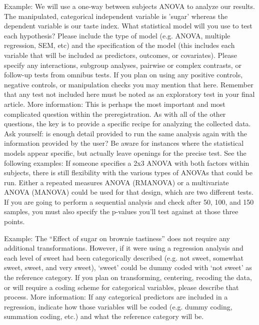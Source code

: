 \documentclass[highlight, explanations]{prereg}
\begin{document}
{Example:  We will use a one-way between subjects ANOVA to analyze our results. The manipulated, categorical independent variable is 'sugar' whereas the dependent variable is our taste index. 
}
{What statistical model will you use to test each hypothesis? Please include the type of model (e.g. ANOVA, multiple regression, SEM, etc) and the specification of the model (this includes each variable that will be included as predictors, outcomes, or covariates). Please specify any interactions, subgroup analyses, pairwise or complex contrasts, or follow-up tests from omnibus tests. If you plan on using any positive controls, negative controls, or manipulation checks you may mention that here. Remember that any test not included here must be noted as an exploratory test in your final article. 
More information: This is perhaps the most important and most complicated question within the preregistration. As with all of the other questions, the key is to provide a specific recipe for analyzing the collected data. Ask yourself: is enough detail provided to run the same analysis again with the information provided by the user? Be aware for instances where the statistical models appear specific, but actually leave openings for the precise test. See the following examples: 
If someone specifies a 2x3 ANOVA with both factors within subjects, there is still flexibility with the various types of ANOVAs that could be run. Either a repeated measures ANOVA (RMANOVA) or a multivariate ANOVA (MANOVA) could be used for that design, which are two different tests. 
If you are going to perform a sequential analysis and check after 50, 100, and 150 samples, you must also specify the p-values you’ll test against at those three points.
}


{Example: The “Effect of sugar on brownie tastiness” does not require any additional transformations. However, if it were using a regression analysis and each level of sweet had been categorically described (e.g. not sweet, somewhat sweet, sweet, and very sweet), ‘sweet’ could be dummy coded with ‘not sweet’ as the reference category. 
}
{If you plan on transforming, centering, recoding the data, or will require a coding scheme for categorical variables, please describe that process. More information: If any categorical predictors are included in a regression, indicate how those variables will be coded (e.g. dummy coding, summation coding, etc.) and what the reference category will be.
}
\end{document}
